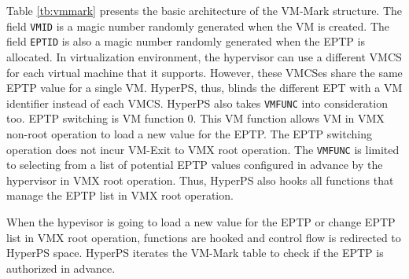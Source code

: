 Table \ref{tb:vmmark} presents the basic architecture of the VM-Mark structure.
The field \verb|VMID| is a magic number randomly generated when the VM is created. 
The field \verb|EPTID| is also a magic number randomly generated when the EPTP is allocated.
In virtualization environment,
the hypervisor can use a different VMCS for each virtual machine that it supports. However, these VMCSes share the same EPTP value for a single VM. 
HyperPS, thus, blinds the different EPT with a VM identifier instead of each VMCS.
HyperPS also takes \verb|VMFUNC| into consideration too. EPTP switching is VM function 0. This VM function allows VM in VMX non-root operation to load a new value for the EPTP. The EPTP switching operation does not incur VM-Exit to VMX root operation.
The \verb|VMFUNC| is limited to selecting from a list of potential EPTP values configured in advance by the hypervisor in VMX root operation. Thus, HyperPS also hooks all functions that manage the EPTP list in VMX root operation.

When the hypevisor is going to load a new value for the EPTP or change EPTP list in VMX root operation, functions are hooked and control flow is redirected to HyperPS space. 
HyperPS iterates the VM-Mark table to check if the EPTP is authorized in advance.


\begin{table}[]
    \caption{VM-Mark Structure}
    \label{tb:vmmark}
\end{table}

